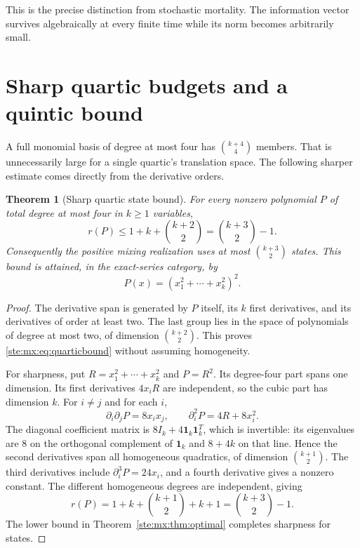 \documentclass[11pt,letterpaper]{article}
\newtheorem{theorem}{Theorem}[section]
\theoremstyle{definition}
\theoremstyle{remark}
\newcommand{\one}{\mathbf 1}
\begin{document}
This is the precise distinction from stochastic mortality. The information
vector survives algebraically at every finite time while its norm becomes
arbitrarily small.

\section{Sharp quartic budgets and a quintic bound}

A full monomial basis of degree at most four has $\binom{k+4}{4}$ members.
That is unnecessarily large for a single quartic's translation space. The
following sharper estimate comes directly from the derivative orders.

\begin{theorem}[Sharp quartic state bound]\label{ste:mx:thm:quartic}
For every nonzero polynomial $P$ of total degree at most four in $k\geq1$
variables,
\begin{equation}\label{ste:mx:eq:quarticbound}
 r(P)\leq 1+k+\binom{k+2}{2}=\binom{k+3}{2}-1.
\end{equation}
Consequently the positive mixing realization uses at most
$\binom{k+3}{2}$ states. This bound is attained, in the exact-series category,
by
\begin{equation}\label{ste:mx:eq:radial}
 P(x)=(x_1^2+\cdots+x_k^2)^2.
\end{equation}
\end{theorem}
\begin{proof}
The derivative span is generated by $P$ itself, its $k$ first derivatives,
and its derivatives of order at least two. The last group lies in the space
of polynomials of degree at most two, of dimension $\binom{k+2}{2}$. This
proves \eqref{ste:mx:eq:quarticbound} without assuming homogeneity.

For sharpness, put $R=x_1^2+\cdots+x_k^2$ and $P=R^2$. Its degree-four
part spans one dimension. Its first derivatives $4x_iR$ are independent,
so the cubic part has dimension $k$. For $i\ne j$ and for each $i$,
\[
 \partial_i\partial_jP=8x_ix_j,\qquad
 \partial_i^2P=4R+8x_i^2.
\]
The diagonal coefficient matrix is $8I_k+4\one_k\one_k^T$, which is
invertible: its eigenvalues are 8 on the orthogonal complement of $\one_k$
and $8+4k$ on that line. Hence the second derivatives span all homogeneous
quadratics, of dimension $\binom{k+1}{2}$. The third derivatives include
$\partial_i^3P=24x_i$, and a fourth derivative gives a nonzero constant.
The different homogeneous degrees are independent, giving
\[
 r(P)=1+k+\binom{k+1}{2}+k+1=\binom{k+3}{2}-1.
\]
The lower bound in Theorem~\ref{ste:mx:thm:optimal} completes sharpness for states.
\end{proof}
\end{document}
